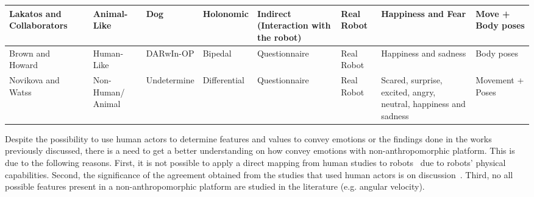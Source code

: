 \begin{table}[h]
\begin{center}
\begin{tabular}{|p{2.3 cm}|p{1.5 cm}|p{1.3 cm}|p{1.4 cm}|p{1.4 cm}|p{1.0 cm}|p{2.2 cm}|p{1.4 cm}|}
\hline
Lakatos and Collaborators~\cite{Lakatos2014}& Animal-Like & Dog & Holonomic & Indirect (Interaction with the robot) & Real Robot & Happiness and Fear &  Move + Body poses \\
\hline
Brown and Howard~\cite{Brown2014}& Human-Like & DARwIn-OP & Bipedal & Questionnaire & Real Robot & Happiness and sadness & Body poses\\
\hline
Novikova and Watss~\cite{Novika2015}&Non-Human/ Animal & Undetermine & Differential& Questionnaire& Real Robot & Scared, surprise, excited, angry, neutral, happiness and sadness &  Movement + Poses\\
\hline 
\end{tabular} 
\end{center}
\end{table}

Despite the possibility to use human actors to determine features and values to convey emotions or the findings done in the works previously discussed, there is a need to get a better understanding on how convey emotions with non-anthropomorphic platform. This is due to the following reasons. First, it is not possible to apply a direct mapping from human studies to robots~\cite{Saerbeck2007,Canamero2010} due to robots' physical capabilities. Second, the significance of the agreement obtained from the studies that used human actors is on discussion~\cite{Russell2003}. Third, no all possible features present in a non-anthropomorphic platform are studied in the literature (e.g. angular velocity). 